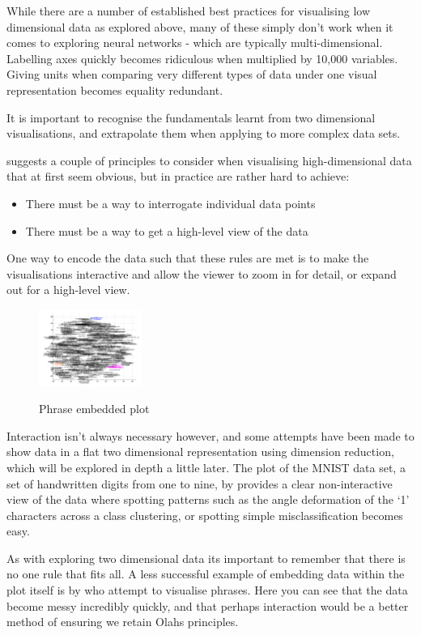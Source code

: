 \documentclass[a4paper,11pt,titlepage]{article}
\begin{document}
		While there are a number of established best practices for visualising low dimensional data as explored above, many of these simply don't work when it comes to exploring neural networks - which are typically multi-dimensional. Labelling axes quickly becomes ridiculous when multiplied by 10,000 variables. Giving units when comparing very different types of data under one visual representation becomes equality redundant.
		\par	 
		It is important to recognise the fundamentals learnt from two dimensional visualisations, and extrapolate them when applying to more complex data sets. 
		\par 
		\cite{Olah2014} suggests a couple of principles to consider when visualising high-dimensional data that at first seem obvious, but in practice are rather hard to achieve:
		\begin{itemize}
			\item There must be a way to interrogate individual data points
			\item There must be a way to get a high-level view of the data
		\end{itemize}
		\par 
		One way to encode the data such that these rules are met is to make the visualisations interactive and allow the viewer to zoom in for detail, or expand out for a high-level view. 
		\par 
 		 		
 	\begin{figure}[H]
    			\centering	
			{{\includegraphics[width=0.3\textwidth]
    				{img/word_embeddings_messy.png} 
    			}}%
    			\caption{Phrase embedded plot}%
    		\label{fig:mnistHintonEmbedded}
	\end{figure}
 		
		Interaction isn't always necessary however, and some attempts have been made to show data in a flat two dimensional representation using dimension reduction, which will be explored in depth a little later. The plot of the MNIST data set, a set of handwritten digits from one to nine, by \cite{Maaten2008} provides a clear non-interactive view of the data where spotting patterns such as the angle deformation of the `1' characters across a class clustering, or spotting simple misclassification becomes easy.
		\par 
		As with exploring two dimensional data its important to remember that there is no one rule that fits all. A less successful example of embedding data within the plot itself is by \cite{Cho2014} who attempt to visualise phrases. Here you can see that the data become messy incredibly quickly, and that perhaps interaction would be a better method of ensuring we retain Olahs principles. 
		\par
\end{document}

